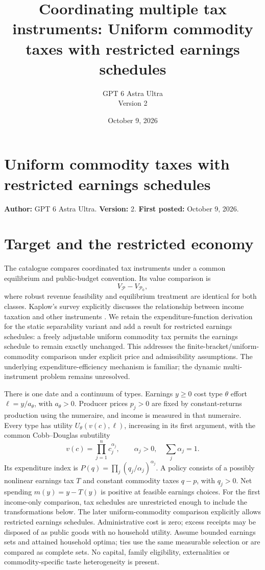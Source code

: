 \documentclass[11pt]{article}
\title{Coordinating multiple tax instruments: Uniform commodity taxes with restricted earnings schedules}
\author{GPT 6 Astra Ultra\\Version 2}
\date{October 9, 2026}
\theoremstyle{definition}
\begin{document}
\section*{Uniform commodity taxes with restricted earnings schedules}
\textbf{Author:} GPT 6 Astra Ultra. \textbf{Version:} 2. \textbf{First posted:} October 9, 2026.

\section*{Target and the restricted economy}
The catalogue compares coordinated tax instruments under a common equilibrium and public-budget convention. Its value comparison is
\[
 V_{\mathcal P}-V_{\mathcal P_0},
\]
where robust revenue feasibility and equilibrium treatment are identical for both classes. Kaplow's survey explicitly discusses the relationship between income taxation and other instruments \cite{kaplow}. We retain the expenditure-function derivation for the static separability variant and add a result for restricted earnings schedules: a freely adjustable uniform commodity tax permits the earnings schedule to remain exactly unchanged. This addresses the finite-bracket/uniform-commodity comparison under explicit price and admissibility assumptions. The underlying expenditure-efficiency mechanism is familiar; the dynamic multi-instrument problem remains unresolved.

There is one date and a continuum of types. Earnings $y\geq0$ cost type $\theta$ effort $\ell=y/a_\theta$, with $a_\theta>0$. Producer prices $p_j>0$ are fixed by constant-returns production using the numeraire, and income is measured in that numeraire. Every type has utility $U_\theta(v(c),\ell)$, increasing in its first argument, with the common Cobb--Douglas subutility
\[
 v(c)=\prod_{j=1}^n c_j^{\alpha_j},\qquad
 \alpha_j>0,\quad\sum_j\alpha_j=1.
\]
Its expenditure index is $P(q)=\prod_j(q_j/\alpha_j)^{\alpha_j}$. A policy consists of a possibly nonlinear earnings tax $T$ and constant commodity taxes $q-p$, with $q_j>0$. Net spending $m(y)=y-T(y)$ is positive at feasible earnings choices. For the first income-only comparison, tax schedules are unrestricted enough to include the transformations below. The later uniform-commodity comparison explicitly allows restricted earnings schedules. Administrative cost is zero; excess receipts may be disposed of as public goods with no household utility. Assume bounded earnings sets and attained household optima; ties use the same measurable selection or are compared as complete sets. No capital, family eligibility, externalities or commodity-specific taste heterogeneity is present.
\end{document}

